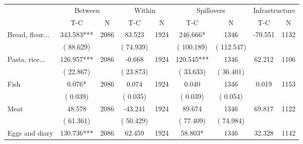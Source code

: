 
\begin{tabular}{l*{8}{c}}\hline&\multicolumn{2}{c}{Between}&\multicolumn{2}{c}{Within}&\multicolumn{2}{c}{Spillovers}&\multicolumn{2}{c}{Infrastructure}\\ \cmidrule(r){2-3}\cmidrule(l){4-5}\cmidrule(l){6-7}\cmidrule(l){8-9} & {T-C} & {N} & {T-C} & {N}  & {T-C}  & {N} & {T-C}  & {N} \\ \midrule
Bread, flour...        &            343.583***      &       2086       &             83.523      &       1924       &            246.666*      &       1346  &      -70.551 &       1132       \\
                       &       (      88.629)            &                               &       (      74.939)            &                               &       (     100.189)            &       (     112.547) &                  \\
Pasta, rice...        &            126.957***      &       2086       &             -0.668      &       1924       &            120.545***      &       1346  &       62.212 &       1106       \\
                       &       (      22.867)            &                               &       (      23.873)            &                               &       (      33.633)            &       (      36.401) &                  \\
Fish        &              0.076*      &       2086       &              0.074      &       1924       &              0.040      &       1346  &        0.019 &       1153       \\
                       &       (       0.039)            &                               &       (       0.035)            &                               &       (       0.039)            &       (       0.054) &                  \\
Meat        &             48.578      &       2086       &            -43.241      &       1924       &             89.674      &       1346  &       69.817 &       1122       \\
                       &       (      61.361)            &                               &       (      50.429)            &                               &       (      77.409)            &       (      74.984) &                  \\
Eggs and diary        &            130.736***      &       2086       &             62.459      &       1924       &             58.803*      &       1346  &       32.328 &       1142       \\

\end{tabular}
